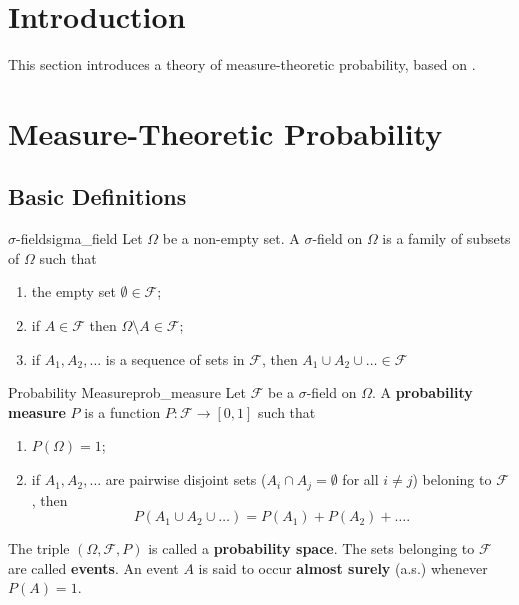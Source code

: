 \section{Introduction}
    This section introduces a theory of measure-theoretic probability, based on \cite{Brzezniak2007}.
\section{Measure-Theoretic Probability}
    \subsection{Basic Definitions}
        \begin{defn}{$\sigma$-field}{sigma_field}
            Let $\Omega$ be a non-empty set. A $\sigma$-field on $\Omega$ is a family of subsets of $\Omega$ such that
            \begin{enumerate}
                \item the empty set $\emptyset \in \mathcal{F}$;
                \item if $A \in \mathcal{F}$ then $\Omega \setminus A \in \mathcal{F}$;
                \item if $A_1, A_2, \dots$ is a sequence of sets in $\mathcal{F}$, then $A_1 \cup A_2 \cup \dots \in \mathcal{F}$ 
            \end{enumerate}
        \end{defn}
        
        \begin{defn}{Probability Measure}{prob_measure}
            Let $\mathcal{F}$ be a $\sigma$-field on $\Omega$. A \textbf{probability measure} $P$ is a function $P: \mathcal{F} \to [0,1]$
            such that
            \begin{enumerate}
                \item $P(\Omega)=1$;
                \item if $A_1, A_2, \dots$ are pairwise disjoint sets ($A_i \cap A_j = \emptyset$ for all $i \neq j$) beloning to $\mathcal{F}$, then
                \begin{equation}
                    P(A_1 \cup A_2 \cup \dots) = P(A_1) + P(A_2) + \dots.
                \end{equation}
            \end{enumerate}
            The triple $(\Omega, \mathcal{F}, P)$ is called a \textbf{probability space}. The sets belonging to $\mathcal{F}$ are called \textbf{events}.
            An event $A$ is said to occur \textbf{almost surely} (a.s.) whenever $P(A)=1$.
        \end{defn}

